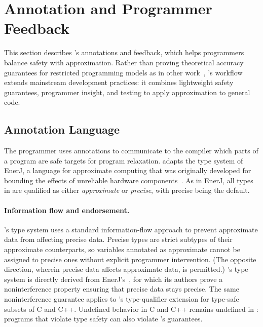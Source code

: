 \section{Annotation and Programmer Feedback}
\label{accept:sec:annotation-feedback}

This section describes \sysname's annotations and feedback,
which helps programmers balance safety with approximation.
Rather than proving theoretical accuracy guarantees for restricted programming
models as in other work~\cite{sasa-sas11, zhu-popl12, passert},
\sysname's workflow extends mainstream development practices: it combines
lightweight safety guarantees, programmer insight, and testing to apply
approximation to general code.

\subsection{Annotation Language}
\label{accept:sec:language}

The programmer uses annotations to communicate to the compiler which parts of
a program are safe targets for program relaxation.
\sysname adapts the type system of EnerJ, a language for approximate computing
that was originally developed for bounding the effects of unreliable hardware
components~\cite{enerj}.
As in EnerJ, all types in \sysname are qualified as either \emph{approximate} or
\emph{precise}, with precise being the default.

\paragraph{Information flow and endorsement.}
\sysname's type system uses a standard information-flow
approach to prevent approximate data from affecting precise data.
%
Precise types are strict subtypes of their approximate counterparts, so
variables annotated as approximate cannot be assigned to precise ones without
explicit programmer intervention.  (The opposite direction, wherein precise data
affects approximate data, is permitted.)
%
\sysname's type system is directly derived from EnerJ's~\cite{enerj}, for which
its authors prove a noninterference property ensuring that precise data stays
precise.  The same noninterference guarantee applies to \sysname's
type-qualifier extension for type-safe subsets of C and C++.
Undefined behavior in C and C++ remains undefined in \sysname:
programs that violate type safety can also violate \sysname's guarantees.


